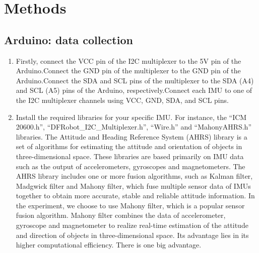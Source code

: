 \section{Methods}


\subsection{Arduino: data collection}\label{subsec:data-fetching}
\begin{enumerate}
	\item   Firstly, connect the VCC pin of the I2C multiplexer to the 5V pin of the Arduino.Connect the GND pin of the multiplexer to the GND pin of the Arduino.Connect the SDA and SCL pins of the multiplexer to the SDA (A4) and SCL (A5) pins of the Arduino, respectively.Connect each IMU to one of the I2C multiplexer channels using VCC, GND, SDA, and SCL pins.
	\item   Install the required libraries for your specific IMU. For instance, the ``ICM 20600.h'', ``DFRobot\_I2C\_Multiplexer.h'', ``Wire.h” and ``MahonyAHRS.h'' libraries.
	The Attitude and Heading Reference System (AHRS) library is a set of algorithms for estimating the attitude and orientation of objects in three-dimensional space.
	These libraries are based primarily on IMU data such as the output of accelerometers, gyroscopes and magnetometers.
	The AHRS library includes one or more fusion algorithms, such as Kalman filter, Madgwick filter and Mahony filter, which fuse multiple sensor data of IMUs together to obtain more accurate, stable and reliable attitude information.
	In the experiment, we choose to use Mahony filter, which is a popular sensor fusion algorithm.
	Mahony filter combines the data of accelerometer, gyroscope and magnetometer to realize real-time estimation of the attitude and direction of objects in three-dimensional space.
	Its advantage lies in its higher computational efficiency. There is one big advantage.
\end{enumerate}


